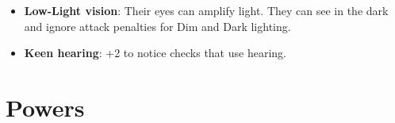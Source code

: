 \documentclass[10pt,twoside]{article}
\begin{document}
\begin{multicols}{2}
\begin{itemize}
\begin{itemize}
    \item \textbf{Low-Light vision}: Their eyes can amplify light. They can see in the dark and ignore attack penalties for Dim and Dark lighting.

    \item \textbf{Keen hearing}: +2 to notice checks that use hearing.
\end{itemize}

\end{itemize}

\end{multicols}

\newpage


\section{Powers}
\end{document}
